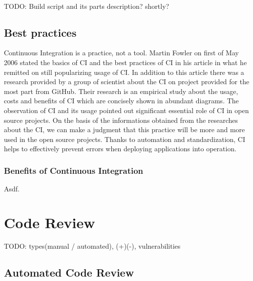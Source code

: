 \hfill\\
{\color{red}TODO: Build script and its parts description? shortly?}

\subsection{Best practices}

Continuous Integration is a practice, not a tool\cite{CollabNet}. Martin Fowler on first of May 2006 stated the basics of CI and the best practices of CI in his article in what he remitted on still popularizing usage of CI. In addition to this article there was a research provided by a group of scientist about the CI on project provided for the most part from GitHub. Their research is an empirical study about the usage, costs and benefits of CI which are concisely shown in abundant diagrams. The observation of CI and its usage pointed out significant essential role of CI in open source projects. On the basis of the informations obtained from the researches about the CI, we can make a judgment that this practice will be more and more used in the open source projects. Thanks to automation and standardization, CI helps to effectively prevent errors when deploying applications into operation\cite{CIWI}.

\subsubsection{Benefits of Continuous Integration}

Asdf.


\section{Code Review}

{\color{red}TODO: types(manual / automated), (+)(-), vulnerabilities}

\subsection{Automated Code Review}

